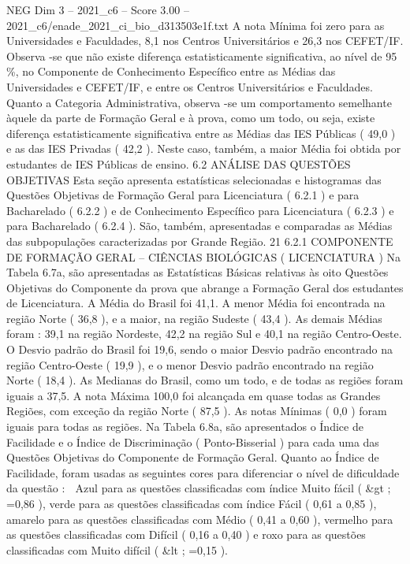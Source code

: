 \begin{textsample}{NEG Dim 3 – 2021\_c6 – Score 3.00 – 2021\_c6/enade\_2021\_ci\_bio\_d313503e1f.txt}
A nota Mínima foi zero para as Universidades e Faculdades, 8,1 nos Centros Universitários e 26,3 nos CEFET/IF.
Observa -se que não existe diferença estatisticamente significativa, ao nível de 95 \%, no Componente de Conhecimento Específico entre as Médias das Universidades e CEFET/IF, e entre os Centros Universitários e Faculdades.
Quanto a Categoria Administrativa, observa -se um comportamento semelhante àquele da parte de Formação Geral e à prova, como um todo, ou seja, existe diferença estatisticamente significativa entre as Médias das IES Públicas ( 49,0 ) e as das IES Privadas ( 42,2 ).
Neste caso, também, a maior Média foi obtida por estudantes de IES Públicas de ensino. 6.2 ANÁLISE DAS QUESTÕES OBJETIVAS Esta seção apresenta estatísticas selecionadas e histogramas das Questões Objetivas de Formação Geral para Licenciatura ( 6.2.1 ) e para Bacharelado ( 6.2.2 ) e de Conhecimento Específico para Licenciatura ( 6.2.3 ) e para Bacharelado ( 6.2.4 ).
São, também, apresentadas e comparadas as Médias das subpopulações caracterizadas por Grande Região. 21 6.2.1 COMPONENTE DE FORMAÇÃO GERAL – CIÊNCIAS BIOLÓGICAS ( LICENCIATURA ) Na Tabela 6.7a, são apresentadas as Estatísticas Básicas relativas às oito Questões Objetivas do Componente da prova que abrange a Formação Geral dos estudantes de Licenciatura.
A Média do Brasil foi 41,1.
A menor Média foi encontrada na região Norte ( 36,8 ), e a maior, na região Sudeste ( 43,4 ).
As demais Médias foram : 39,1 na região Nordeste, 42,2 na região Sul e 40,1 na região Centro-Oeste.
O Desvio padrão do Brasil foi 19,6, sendo o maior Desvio padrão encontrado na região Centro-Oeste ( 19,9 ), e o menor Desvio padrão encontrado na região Norte ( 18,4 ).
As Medianas do Brasil, como um todo, e de todas as regiões foram iguais a 37,5.
A nota Máxima 100,0 foi alcançada em quase todas as Grandes Regiões, com exceção da região Norte ( 87,5 ).
As notas Mínimas ( 0,0 ) foram iguais para todas as regiões.
Na Tabela 6.8a, são apresentados o Índice de Facilidade e o Índice de Discriminação ( Ponto-Bisserial ) para cada uma das Questões Objetivas do Componente de Formação Geral.
Quanto ao Índice de Facilidade, foram usadas as seguintes cores para diferenciar o nível de dificuldade da questão :  Azul para as questões classificadas com índice Muito fácil ( \&gt ; =0,86 ), verde para as questões classificadas com índice Fácil ( 0,61 a 0,85 ), amarelo para as questões classificadas com Médio ( 0,41 a 0,60 ), vermelho para as questões classificadas com Difícil ( 0,16 a 0,40 ) e roxo para as questões classificadas com Muito difícil ( \&lt ; =0,15 ).

\end{textsample}
